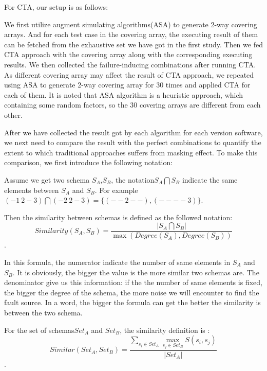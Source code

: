 \documentclass{sig-alternate}
\begin{document}
For CTA, our setup is as follows:

We first utilize augment simulating algorithms(ASA) to generate 2-way covering arrays. And for each test case in the covering array, the executing result of them can be fetched from the exhaustive set we have got in the first study. Then we fed CTA approach with the covering array along with the corresponding executing results. We then collected the failure-inducing combinations after running CTA. As different covering array may affect the result of CTA approach, we repeated using ASA to generate 2-way covering array for 30 times and applied CTA for each of them. It is noted that ASA algorithm is a heuristic approach, which containing some random factors, so the 30 covering arrays are different from each other.

After we have collected the result got by each algorithm for each version software, we next need to compare the result with the perfect combinations to quantify the extent to which traditional approaches suffers from masking effect. To make this comparison, we first introduce the following notation:

Assume we get two schema $S_{A}$,$S_{B}$, the notation$S_{A} \bigcap S_{B}$ indicate the same elements between $S_{A}$ and $S_{B}$. For example $(- 1\ 2 - 3) \bigcap  (- 2\ 2 - 3) = \{ (- - 2 - -) , (- - - - 3)\}$.

Then the similarity between schemas is defined as the followed notation:
\begin{displaymath} Similarity(S_{A},S_{B})= \frac{|S_{A} \bigcap S_{B}|}{\max (Degree(S_{A}),Degree(S_{B})) } \end{displaymath}.

In this formula, the numerator indicate the number of same elements in  $S_{A}$ and $S_{B}$. It is obviously, the bigger the value is the more similar two schemas are.  The denominator give us this information: if the the number of same elements is fixed, the bigger the degree of the schema, the more noise we will encounter to find the fault source. In a word, the bigger the formula can get the better the similarity is between the two schema.

For the set of schemas$ Set_{A}$ and $Set_{B}$, the similarity definition is :
\begin{displaymath} Similar(Set_{A},Set_{B})= \frac{\sum _{s_{i}\in Set_{A}}\max _{s_{j}\in Set_{B}}S\left( s_{i},s_{j}\right)}{|Set_{A}|} \end{displaymath}.
\end{document}
